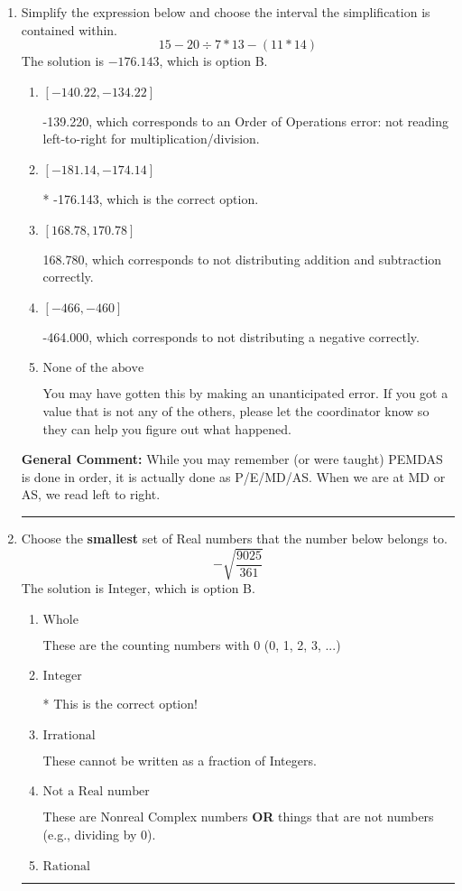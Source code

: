 \documentclass{extbook}[14pt]
\newcommand{\litem}[1]{\item #1

\rule{\textwidth}{0.4pt}}
\begin{document}
\begin{enumerate}\litem{
Simplify the expression below and choose the interval the simplification is contained within.
\[ 15 - 20 \div 7 * 13 - (11 * 14) \]The solution is \( -176.143 \), which is option B.\begin{enumerate}[label=\Alph*.]
\item \( [-140.22, -134.22] \)

 -139.220, which corresponds to an Order of Operations error: not reading left-to-right for multiplication/division.
\item \( [-181.14, -174.14] \)

* -176.143, which is the correct option.
\item \( [168.78, 170.78] \)

 168.780, which corresponds to not distributing addition and subtraction correctly.
\item \( [-466, -460] \)

 -464.000, which corresponds to not distributing a negative correctly.
\item \( \text{None of the above} \)

 You may have gotten this by making an unanticipated error. If you got a value that is not any of the others, please let the coordinator know so they can help you figure out what happened.
\end{enumerate}

\textbf{General Comment:} While you may remember (or were taught) PEMDAS is done in order, it is actually done as P/E/MD/AS. When we are at MD or AS, we read left to right.
}
\litem{
Choose the \textbf{smallest} set of Real numbers that the number below belongs to.
\[ -\sqrt{\frac{9025}{361}} \]The solution is \( \text{Integer} \), which is option B.\begin{enumerate}[label=\Alph*.]
\item \( \text{Whole} \)

These are the counting numbers with 0 (0, 1, 2, 3, ...)
\item \( \text{Integer} \)

* This is the correct option!
\item \( \text{Irrational} \)

These cannot be written as a fraction of Integers.
\item \( \text{Not a Real number} \)

These are Nonreal Complex numbers \textbf{OR} things that are not numbers (e.g., dividing by 0).
\item \( \text{Rational} \)


\end{enumerate}}
\end{enumerate}
\end{document}
